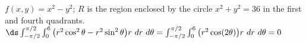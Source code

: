 {$f(x,y) = x^2-y^2$; $R$ is the region enclosed by the circle $x^2+y^2=36$ in the first and fourth quadrants.
}
{$\ds \int_{-\pi/2}^{\pi/2}\int_{0}^{6} \big(r^2\cos^2\theta-r^2\sin^2\theta\big)r\ dr\ d\theta = \int_{-\pi/2}^{\pi/2}\int_{0}^{6} \big(r^2\cos(2\theta)\big)r\ dr\ d\theta= 0$
}